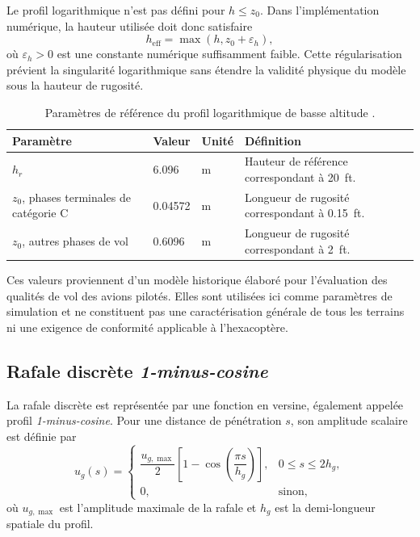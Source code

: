 \documentclass[11pt,a4paper,oneside]{report}
\newcommand{\english}[1]{\textit{#1}}
\begin{document}
	Le profil logarithmique n'est pas défini pour $h\leq z_0$. Dans l'implémentation numérique, la hauteur utilisée doit donc satisfaire
	\begin{equation}
		h_{\mathrm{eff}}
		=
		\max\left(h,z_0+\varepsilon_h\right),
		\label{eq_effective_log_height}
	\end{equation}
	où $\varepsilon_h>0$ est une constante numérique suffisamment faible. Cette régularisation prévient la singularité logarithmique sans étendre la validité physique du modèle sous la hauteur de rugosité.
	
	\begin{table}[H]
		\centering
		\caption{Paramètres de référence du profil logarithmique de basse altitude \cite{MILF8785C}.}
		\label{tab_log_wind_reference}
		\begin{tabularx}{\textwidth}{@{}L{4.8cm}L{3.0cm}L{2.4cm}Y@{}}
			\toprule
			\textbf{Paramètre} &
			\textbf{Valeur} &
			\textbf{Unité} &
			\textbf{Définition}\\
			\midrule
			$h_r$ &
			\num{6.096} &
			\si{m} &
			Hauteur de référence correspondant à \SI{20}{ft}.\\
			$z_0$, phases terminales de catégorie C &
			\num{0.04572} &
			\si{m} &
			Longueur de rugosité correspondant à \SI{0.15}{ft}.\\
			$z_0$, autres phases de vol &
			\num{0.6096} &
			\si{m} &
			Longueur de rugosité correspondant à \SI{2}{ft}.\\
			\bottomrule
		\end{tabularx}
	\end{table}
	
	Ces valeurs proviennent d'un modèle historique élaboré pour l'évaluation des qualités de vol des avions pilotés. Elles sont utilisées ici comme paramètres de simulation et ne constituent pas une caractérisation générale de tous les terrains ni une exigence de conformité applicable à l'hexacoptère.
	
	\subsection{Rafale discrète \english{1-minus-cosine}}
	
	La rafale discrète est représentée par une fonction en versine, également appelée profil \english{1-minus-cosine}. Pour une distance de pénétration $s$, son amplitude scalaire est définie par
	\begin{equation}
		u_g(s)
		=
		\begin{cases}
			\dfrac{u_{g,\max}}{2}
			\left[
			1-\cos\!\left(
			\dfrac{\pi s}{h_g}
			\right)
			\right],
			&
			0\leq s\leq 2h_g,
			\\[3mm]
			0,
			&
			\text{sinon},
		\end{cases}
		\label{eq_one_minus_cos}
	\end{equation}
	où $u_{g,\max}$ est l'amplitude maximale de la rafale et $h_g$ est la demi-longueur spatiale du profil.
	
\end{document}
